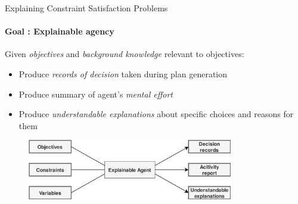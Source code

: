 \documentclass{beamer}
\begin{document}
\begin{frame}{\small{Explaining Constraint Satisfaction Problems}}
    \framesubtitle{Goal : Explainable agency}

    Given \emph{objectives} and \emph{background knowledge} relevant to objectives:
    \begin{itemize}
        \item \small{Produce \emph{records of decision} taken during plan generation}
        \item \small{Produce summary of agent's \emph{mental effort}}
        \item \small{Produce \emph{understandable explanations} about specific choices and reasons for them}
    \end{itemize}
    \vspace*{1em}
    \begin{figure}[]
        \centering
        \includegraphics[width=0.8\textwidth]{figures/explainable_agency2}
    \end{figure}


\end{frame}
\end{document}
